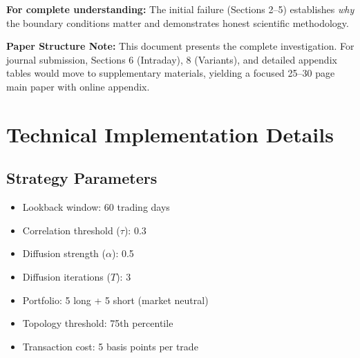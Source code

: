 \documentclass[12pt,letterpaper]{article}
\begin{document}
\textbf{For complete understanding:} The initial failure (Sections 2--5) establishes \textit{why} the boundary conditions matter and demonstrates honest scientific methodology.

\textbf{Paper Structure Note:} This document presents the complete investigation. For journal submission, Sections 6 (Intraday), 8 (Variants), and detailed appendix tables would move to supplementary materials, yielding a focused 25--30 page main paper with online appendix.


\clearpage


















\appendix

\section{Technical Implementation Details}
\label{app:technical}

\subsection{Strategy Parameters}
\begin{itemize}
    \item Lookback window: 60 trading days
    \item Correlation threshold ($\tau$): 0.3
    \item Diffusion strength ($\alpha$): 0.5
    \item Diffusion iterations ($T$): 3
    \item Portfolio: 5 long + 5 short (market neutral)
    \item Topology threshold: 75th percentile
    \item Transaction cost: 5 basis points per trade
\end{itemize}
\end{document}
